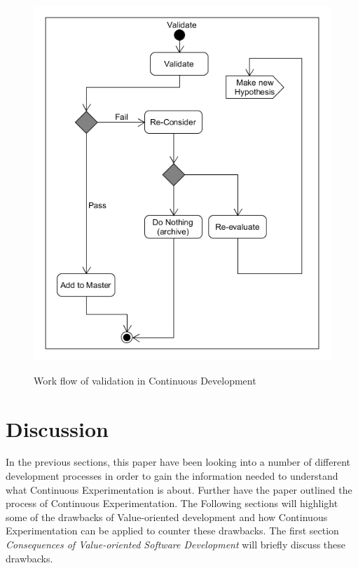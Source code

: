 \documentclass{sig-alternate}
\begin{document}
\begin{figure}
\centering
\caption{Work flow of validation in Continuous Development}
\includegraphics[scale=0.4]{Umlet/ValidateActivity}
\label{fig:validation}
\end{figure}

\section{Discussion}
In the previous sections, this paper have been looking into a number of different development processes in order to gain the information needed to understand what Continuous Experimentation is about. Further have the paper outlined the process of Continuous Experimentation. The Following sections will highlight some of the drawbacks of Value-oriented development and how Continuous Experimentation can be applied to counter these drawbacks. The first section \textit{Consequences of Value-oriented Software Development} will briefly discuss these drawbacks. 
\end{document}
